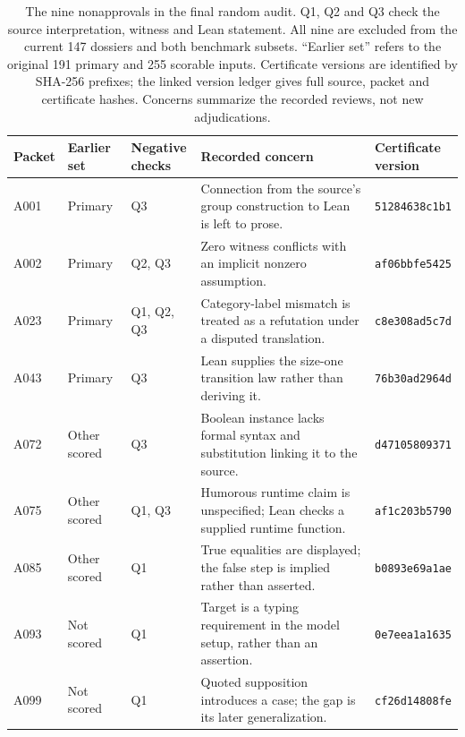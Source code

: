 \begin{table}[ht]
\centering\small
\setlength{\tabcolsep}{3pt}
\caption{The nine nonapprovals in the final random audit. Q1, Q2 and Q3 check the source interpretation, witness and Lean statement. All nine are excluded from the current 147 dossiers and both benchmark subsets. ``Earlier set'' refers to the original 191 primary and 255 scorable inputs. Certificate versions are identified by SHA-256 prefixes; the linked version ledger gives full source, packet and certificate hashes. Concerns summarize the recorded reviews, not new adjudications.}
\label{tab:final-human-audit-exclusions}
\begin{tabular}{lll p{5.1cm} l}
\toprule
Packet & Earlier set & \shortstack{Negative\\checks} & Recorded concern & \shortstack{Certificate\\version} \\
\midrule
A001 & Primary & Q3 & Connection from the source's group construction to Lean is left to prose. & \texttt{51284638c1b1} \\
A002 & Primary & Q2, Q3 & Zero witness conflicts with an implicit nonzero assumption. & \texttt{af06bbfe5425} \\
A023 & Primary & Q1, Q2, Q3 & Category-label mismatch is treated as a refutation under a disputed translation. & \texttt{c8e308ad5c7d} \\
A043 & Primary & Q3 & Lean supplies the size-one transition law rather than deriving it. & \texttt{76b30ad2964d} \\
A072 & Other scored & Q3 & Boolean instance lacks formal syntax and substitution linking it to the source. & \texttt{d47105809371} \\
A075 & Other scored & Q1, Q3 & Humorous runtime claim is unspecified; Lean checks a supplied runtime function. & \texttt{af1c203b5790} \\
A085 & Other scored & Q1 & True equalities are displayed; the false step is implied rather than asserted. & \texttt{b0893e69a1ae} \\
A093 & Not scored & Q1 & Target is a typing requirement in the model setup, rather than an assertion. & \texttt{0e7eea1a1635} \\
A099 & Not scored & Q1 & Quoted supposition introduces a case; the gap is its later generalization. & \texttt{cf26d14808fe} \\
\bottomrule
\end{tabular}
\end{table}

